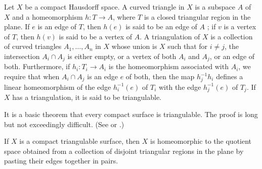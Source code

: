 \begin{definition}
	Let \(X\) be a compact Hausdorff space. A curved triangle in \(X\) is a subspace \(A\) of \(X\) and a homeomorphism \(h : T \rightarrow A\), where \(T\) is a closed triangular region in the plane. If \(e\) is an edge of \(T\), then \(h( e)\) is said to be an edge of \(A\) ; if \(v\) is a vertex of \(T\), then \(h( v)\) is said to be a vertex of \(A\). A triangulation of \(X\) is a collection of curved triangles \(A_{1},\ldots ,A_{n}\) in \(X\) whose union is \(X\) such that for \(i \neq j\), the intersection \(A_{i} \cap {A}_{j}\) is either empty, or a vertex of both \(A_{i}\) and \(A_{j}\), or an edge of both. Furthermore, if \(h_{i} : T_{i} \rightarrow {A}_{i}\) is the homeomorphism associated with \(A_{i}\), we require that when \(A_{i} \cap {A}_{j}\) is an edge \(e\) of both, then the map \(h_j^{-1}h_{i}\) defines a linear homeomorphism of the edge \(h_i^{-1}( e)\) of \(T_{i}\) with the edge \(h_j^{-1}( e)\) of \(T_{j}\). If \(X\) has a triangulation, it is said to be triangulable.
\end{definition}

It is a basic theorem that every compact surface is triangulable. The proof is long but not exceedingly difficult. (See 		\cite{AhlforsSario1960} or 		\cite{DoyleMoran1968}.)

\begin{theorem}
\label{thm:\thetheorem}
	If \(X\) is a compact triangulable surface, then \(X\) is homeomorphic to the quotient space obtained from a collection of disjoint triangular regions in the plane by pasting their edges together in pairs.
\end{theorem}

